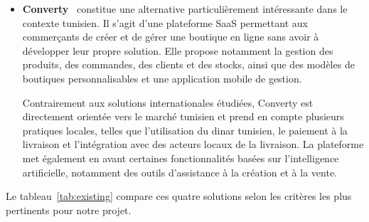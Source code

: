 \begin{itemize}
\item \textbf{Converty}~\cite{Converty2026} constitue une alternative particulièrement
intéressante dans le contexte tunisien. Il s'agit d'une plateforme SaaS permettant aux
commerçants de créer et de gérer une boutique en ligne sans avoir à développer leur propre
solution. Elle propose notamment la gestion des produits, des commandes, des clients et
des stocks, ainsi que des modèles de boutiques personnalisables et une application mobile
de gestion.

Contrairement aux solutions internationales étudiées, Converty est directement orientée
vers le marché tunisien et prend en compte plusieurs pratiques locales, telles que
l'utilisation du dinar tunisien, le paiement à la livraison et l'intégration avec des acteurs
locaux de la livraison. La plateforme met également en avant certaines fonctionnalités
basées sur l'intelligence artificielle, notamment des outils d'assistance à la création et à
la vente.


\end{itemize}

\Needspace{15cm}

Le tableau~\ref{tab:existing} compare ces quatre solutions selon les critères les plus
pertinents pour notre projet.

